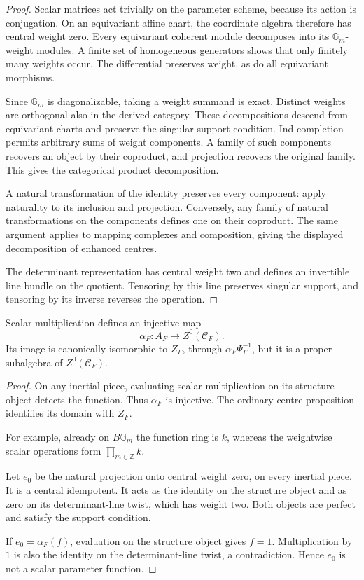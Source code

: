 \begin{proof}
Scalar matrices act trivially on the parameter scheme,
because its action is conjugation. On an equivariant
affine chart, the coordinate algebra therefore has
central weight zero. Every equivariant coherent
module decomposes into its \(\mathbb G_m\)-weight
modules. A finite set of homogeneous generators
shows that only finitely many weights occur.
The differential preserves weight, as do all
equivariant morphisms.

Since \(\mathbb G_m\) is diagonalizable, taking a
weight summand is exact. Distinct weights are
orthogonal also in the derived category. These
decompositions descend from equivariant charts and
preserve the singular-support condition.
Ind-completion permits arbitrary sums of weight
components. A family of such components recovers
an object by their coproduct, and projection
recovers the original family. This gives the
categorical product decomposition.

A natural transformation of the identity preserves
every component: apply naturality to its inclusion
and projection. Conversely, any family of natural
transformations on the components defines one on
their coproduct. The same argument applies to
mapping complexes and composition, giving the
displayed decomposition of enhanced centres.

The determinant representation has central weight
two and defines an invertible line bundle on the
quotient. Tensoring by this line preserves singular
support, and tensoring by its inverse reverses the
operation.
\end{proof}

\begin{proposition}
\label{v4-arith:w10-e:prop:scalar-centre-obstruction}
\ClaimStatusProvedHere
Scalar multiplication defines an injective map
\[
 \alpha_F:A_F\longrightarrow Z^0(\mathcal C_F).
\]
Its image is canonically isomorphic to \(Z_F\), through
\(\alpha_F\Psi_F^{-1}\), but it is a proper subalgebra
of \(Z^0(\mathcal C_F)\).
\end{proposition}

\begin{proof}
On any inertial piece, evaluating scalar
multiplication on its structure object detects the
function. Thus \(\alpha_F\) is injective.
The ordinary-centre proposition identifies its
domain with \(Z_F\).

For example, already on $B\mathbb G_m$ the function ring is $k$,
whereas the weightwise scalar operations form $\prod_{m\in\mathbb Z}k$.

Let \(e_0\) be the natural projection onto central
weight zero, on every inertial piece. It is a
central idempotent. It acts as the identity on the
structure object and as zero on its determinant-line
twist, which has weight two. Both objects are
perfect and satisfy the support condition.

If \(e_0=\alpha_F(f)\), evaluation on the structure
object gives \(f=1\). Multiplication by \(1\) is also
the identity on the determinant-line twist, a
contradiction. Hence \(e_0\) is not a scalar
parameter function.
\end{proof}

